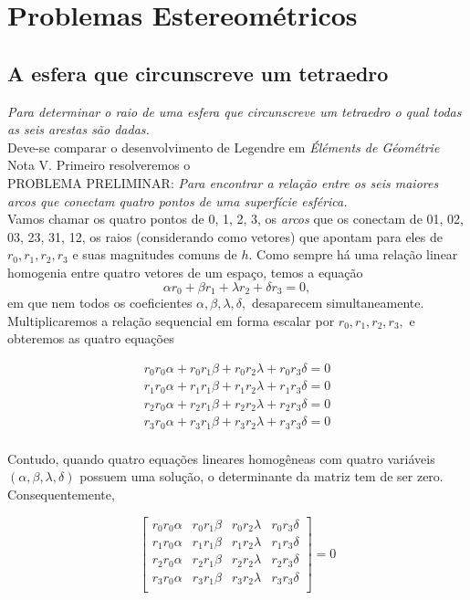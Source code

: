 \chapter{Problemas Estereométricos}

\section{A esfera que circunscreve um tetraedro}
\textit{Para determinar o raio de uma esfera que circunscreve um tetraedro o qual todas as seis arestas são dadas.}\\
Deve-se comparar o desenvolvimento de Legendre em \textit{Éléments de Géométrie} Nota V. Primeiro resolveremos o\\
PROBLEMA PRELIMINAR: \textit{Para encontrar a relação entre os seis maiores arcos que conectam quatro pontos de uma superfície esférica.}\\
Vamos chamar os quatro pontos de 0, 1, 2, 3, os \textit{arcos} que os conectam de 01, 02, 03, 23, 31, 12, os raios (considerando como vetores) que apontam para eles de $r_0, r_1, r_2, r_3$ e suas magnitudes comuns de $h$. Como sempre há uma relação linear homogenia entre quatro vetores de um espaço, temos a equação
$$\alpha r_0+\beta r_1+\lambda r_2 + \delta r_3 =0,$$
em que nem todos os coeficientes $\alpha, \beta, \lambda, \delta,$ desaparecem simultaneamente. Multiplicaremos a relação sequencial em forma escalar por $r_0, r_1, r_2, r_3, $ e obteremos as quatro equações

\begin{eqnarray*}
	r_0r_0\alpha+r_0r_1\beta + r_0r_2\lambda + r_0r_3\delta = 0\\
	r_1r_0\alpha+r_1r_1\beta + r_1r_2\lambda + r_1r_3\delta = 0\\
	r_2r_0\alpha+r_2r_1\beta + r_2r_2\lambda + r_2r_3\delta = 0\\
	r_3r_0\alpha+r_3r_1\beta + r_3r_2\lambda + r_3r_3\delta = 0\\
\end{eqnarray*}

Contudo, quando quatro equações lineares homogêneas com quatro variáveis $(\alpha, \beta, \lambda, \delta)$ possuem uma solução, o determinante da matriz tem de ser zero. Consequentemente,

$$\left[
\begin{array}{cccc}
	r_0r_0\alpha & r_0r_1\beta & r_0r_2\lambda & r_0r_3\delta\\
	r_1r_0\alpha & r_1r_1\beta & r_1r_2\lambda & r_1r_3\delta\\
	r_2r_0\alpha & r_2r_1\beta & r_2r_2\lambda & r_2r_3\delta\\
	r_3r_0\alpha & r_3r_1\beta & r_3r_2\lambda & r_3r_3\delta\\
\end{array}
\right]=0$$

